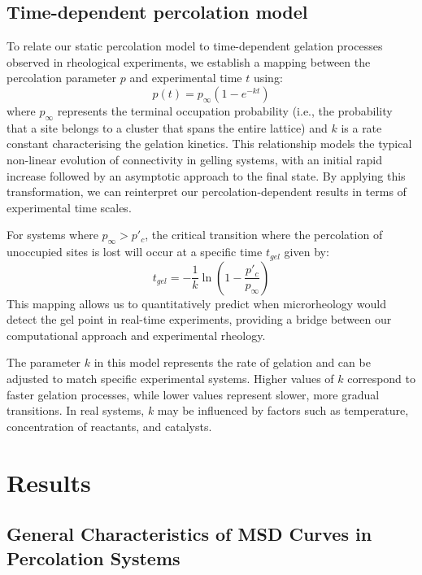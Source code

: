\documentclass[%
 aip,
 amsmath,amssymb,
reprint, onecolumn %
]{revtex4-1}
\begin{document}
\subsection{Time-dependent percolation model}

To relate our static percolation model to time-dependent gelation processes observed in rheological experiments, we establish a mapping between the percolation parameter $p$ and experimental time $t$ using:
\begin{equation}\label{eqn:gel_process}
p(t) = p_\infty(1-e^{-kt})
\end{equation}
where $p_\infty$ represents the terminal occupation probability (i.e., the probability that a site belongs to a cluster that spans the entire lattice) and $k$ is a rate constant characterising the gelation kinetics. This relationship models the typical non-linear evolution of connectivity in gelling systems, with an initial rapid increase followed by an asymptotic approach to the final state. By applying this transformation, we can reinterpret our percolation-dependent results in terms of experimental time scales.

For systems where $p_\infty > p'_c$, the critical transition where the percolation of unoccupied sites is lost will occur at a specific time $t_{gel}$ given by:
\begin{equation}\label{eqn:t_gel}
t_{gel} = -\frac{1}{k}\ln\left(1-\frac{p'_c}{p_\infty}\right)
\end{equation}
This mapping allows us to quantitatively predict when microrheology would detect the gel point in real-time experiments, providing a bridge between our computational approach and experimental rheology.

The parameter $k$ in this model represents the rate of gelation and can be adjusted to match specific experimental systems. Higher values of $k$ correspond to faster gelation processes, while lower values represent slower, more gradual transitions. In real systems, $k$ may be influenced by factors such as temperature, concentration of reactants, and catalysts.


\section{Results}

\subsection{General Characteristics of MSD Curves in Percolation Systems}
\end{document}
